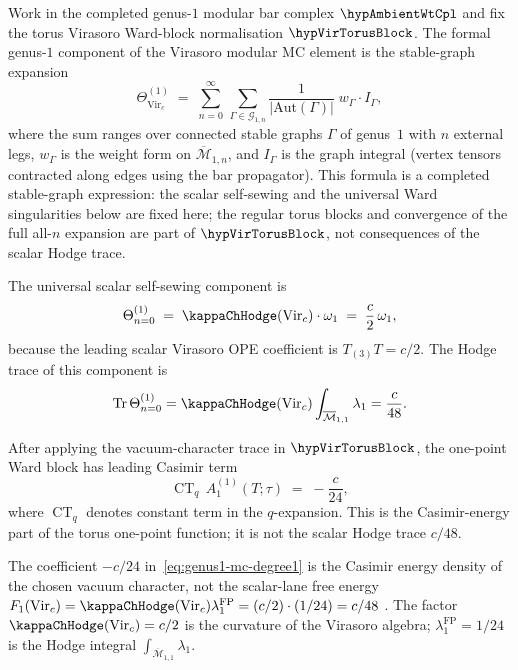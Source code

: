 \begin{theorem}
\label{thm:genus1-mc-virasoro}
Work in the completed genus-$1$ modular bar complex
\(\hypAmbientWtCpl\) and fix the torus Virasoro Ward-block
normalisation \(\hypVirTorusBlock\).  The formal genus-$1$ component
of the Virasoro modular MC element is the stable-graph expansion
\begin{equation}\label{eq:genus1-mc-explicit}
\Theta^{(1)}_{\mathrm{Vir}_c}
\;=\;
\sum_{n=0}^{\infty}\,
\sum_{\Gamma \in \mathcal{G}_{1,n}}
\frac{1}{|\mathrm{Aut}(\Gamma)|}\;
w_\Gamma \cdot I_\Gamma,
\end{equation}
where the sum ranges over connected stable graphs $\Gamma$ of
genus~$1$ with $n$ external legs, $w_\Gamma$ is the weight form
on $\overline{\mathcal{M}}_{1,n}$, and $I_\Gamma$ is the
graph integral (vertex tensors contracted along edges using the
bar propagator).  This formula is a completed stable-graph expression:
the scalar self-sewing and the universal Ward singularities below are
fixed here; the regular torus blocks and convergence of the full
all-\(n\) expansion are part of \(\hypVirTorusBlock\), not consequences
of the scalar Hodge trace.

The universal scalar self-sewing component is
\begin{equation}\label{eq:genus1-mc-degree0}
\Theta^{(1)}_{n=0}
\;=\;
\kappaChHodge(\mathrm{Vir}_c) \cdot \omega_1
\;=\;
\frac{c}{2}\,\omega_1,
\end{equation}
because the leading scalar Virasoro OPE coefficient is
\(T_{(3)}T=c/2\).  The Hodge trace of this component is
\[
\operatorname{Tr}\Theta^{(1)}_{n=0}
=\kappaChHodge(\mathrm{Vir}_c)\int_{\overline{\mathcal M}_{1,1}}
\lambda_1
=\frac{c}{48}.
\]

After applying the vacuum-character trace in \(\hypVirTorusBlock\),
the one-point Ward block has leading Casimir term
\begin{equation}\label{eq:genus1-mc-degree1}
\operatorname{CT}_{q}\,A^{(1)}_1(T;\tau)
\;=\;-\frac{c}{24},
\end{equation}
where \(\operatorname{CT}_q\) denotes constant term in the
\(q\)-expansion.  This is the Casimir-energy part of the torus
one-point function; it is not the scalar Hodge trace \(c/48\).

\begin{remark}
The coefficient \(-c/24\) in~\eqref{eq:genus1-mc-degree1} is the
Casimir energy density of the chosen vacuum character, not the
scalar-lane free energy
$F_1(\mathrm{Vir}_c)=\kappaChHodge(\mathrm{Vir}_c)\lambda_1^{\mathrm{FP}}
= (c/2)\cdot(1/24) = c/48$ .
The factor $\kappaChHodge(\mathrm{Vir}_c)=c/2$ is the curvature of the Virasoro algebra;
$\lambda_1^{\mathrm{FP}} = 1/24$ is the Hodge integral
$\int_{\overline{\mathcal{M}}_{1,1}}\lambda_1$.
\end{remark}


\end{theorem}
